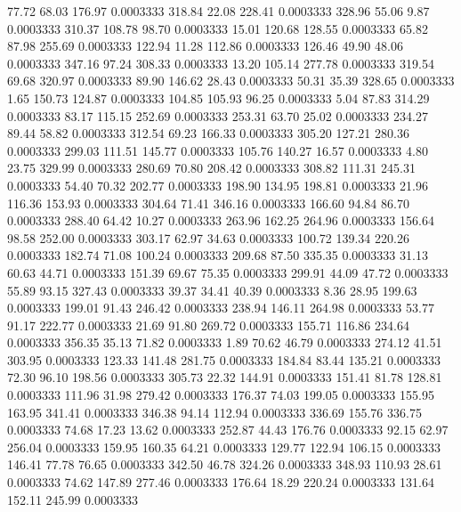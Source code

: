   77.72   68.03  176.97   0.0003333
 318.84   22.08  228.41   0.0003333
 328.96   55.06    9.87   0.0003333
 310.37  108.78   98.70   0.0003333
  15.01  120.68  128.55   0.0003333
  65.82   87.98  255.69   0.0003333
 122.94   11.28  112.86   0.0003333
 126.46   49.90   48.06   0.0003333
 347.16   97.24  308.33   0.0003333
  13.20  105.14  277.78   0.0003333
 319.54   69.68  320.97   0.0003333
  89.90  146.62   28.43   0.0003333
  50.31   35.39  328.65   0.0003333
   1.65  150.73  124.87   0.0003333
 104.85  105.93   96.25   0.0003333
   5.04   87.83  314.29   0.0003333
  83.17  115.15  252.69   0.0003333
 253.31   63.70   25.02   0.0003333
 234.27   89.44   58.82   0.0003333
 312.54   69.23  166.33   0.0003333
 305.20  127.21  280.36   0.0003333
 299.03  111.51  145.77   0.0003333
 105.76  140.27   16.57   0.0003333
   4.80   23.75  329.99   0.0003333
 280.69   70.80  208.42   0.0003333
 308.82  111.31  245.31   0.0003333
  54.40   70.32  202.77   0.0003333
 198.90  134.95  198.81   0.0003333
  21.96  116.36  153.93   0.0003333
 304.64   71.41  346.16   0.0003333
 166.60   94.84   86.70   0.0003333
 288.40   64.42   10.27   0.0003333
 263.96  162.25  264.96   0.0003333
 156.64   98.58  252.00   0.0003333
 303.17   62.97   34.63   0.0003333
 100.72  139.34  220.26   0.0003333
 182.74   71.08  100.24   0.0003333
 209.68   87.50  335.35   0.0003333
  31.13   60.63   44.71   0.0003333
 151.39   69.67   75.35   0.0003333
 299.91   44.09   47.72   0.0003333
  55.89   93.15  327.43   0.0003333
  39.37   34.41   40.39   0.0003333
   8.36   28.95  199.63   0.0003333
 199.01   91.43  246.42   0.0003333
 238.94  146.11  264.98   0.0003333
  53.77   91.17  222.77   0.0003333
  21.69   91.80  269.72   0.0003333
 155.71  116.86  234.64   0.0003333
 356.35   35.13   71.82   0.0003333
   1.89   70.62   46.79   0.0003333
 274.12   41.51  303.95   0.0003333
 123.33  141.48  281.75   0.0003333
 184.84   83.44  135.21   0.0003333
  72.30   96.10  198.56   0.0003333
 305.73   22.32  144.91   0.0003333
 151.41   81.78  128.81   0.0003333
 111.96   31.98  279.42   0.0003333
 176.37   74.03  199.05   0.0003333
 155.95  163.95  341.41   0.0003333
 346.38   94.14  112.94   0.0003333
 336.69  155.76  336.75   0.0003333
  74.68   17.23   13.62   0.0003333
 252.87   44.43  176.76   0.0003333
  92.15   62.97  256.04   0.0003333
 159.95  160.35   64.21   0.0003333
 129.77  122.94  106.15   0.0003333
 146.41   77.78   76.65   0.0003333
 342.50   46.78  324.26   0.0003333
 348.93  110.93   28.61   0.0003333
  74.62  147.89  277.46   0.0003333
 176.64   18.29  220.24   0.0003333
 131.64  152.11  245.99   0.0003333
